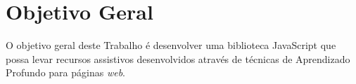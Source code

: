 














\section{Objetivo Geral}

\par O objetivo geral deste Trabalho é desenvolver uma biblioteca JavaScript que possa levar recursos assistivos desenvolvidos através de técnicas de Aprendizado Profundo para páginas \textit{web}.


